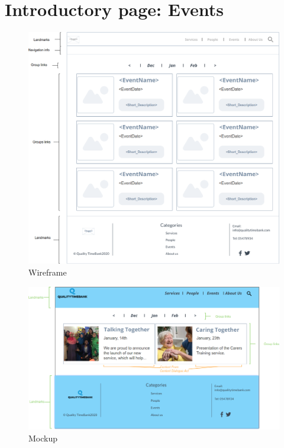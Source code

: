 \documentclass[a4paper, 11pt, parskip=half, headsepline]{scrreprt}
\begin{document}
\section{Introductory page: Events}

\begin{figure}[H]
    \centering
    \includegraphics[width=1\linewidth, keepaspectratio]{wireframes/Introductory-Events}
    \caption{Wireframe}
\end{figure}

\begin{figure}[H]
    \centering
    \includegraphics[width=1\linewidth, keepaspectratio]{mockups/ConcreteEventsJanuary}
    \caption{Mockup}
\end{figure}
\end{document}
